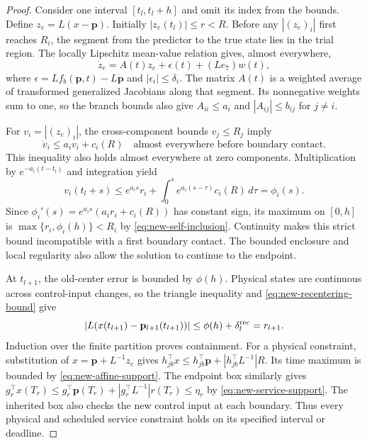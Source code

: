 \documentclass[preprint,12pt]{elsarticle}
\theoremstyle{definition}
\theoremstyle{plain}
\theoremstyle{definition}
\theoremstyle{plain}
\begin{document}
\begin{proof}
Consider one interval $[t_l,t_l+h]$ and omit its index from the bounds.
Define $z_e=L(x-\mathbf p)$. Initially $|z_e(t_l)|\le r<R$.
Before any $|(z_e)_i|$ first reaches $R_i$, the segment from the predictor
to the true state lies in the trial region. The locally Lipschitz
mean-value relation \cite{clarke1990optimization} gives, almost everywhere,
\begin{equation}
 \dot z_e=A(t)z_e+\epsilon(t)+(Le_7)w(t),
 \label{eq:new-error-dynamics}
\end{equation}
where $\epsilon=Lf_b(\mathbf p,t)-L\dot{\mathbf p}$ and
$|\epsilon_i|\le\delta_i$. The matrix $A(t)$ is a weighted average of
transformed generalized Jacobians along that segment. Its nonnegative
weights sum to one, so the branch bounds also give
$A_{ii}\le a_i$ and $|A_{ij}|\le b_{ij}$ for $j\ne i$.

For $v_i=|(z_e)_i|$, the cross-component bounds $v_j\le R_j$ imply
\begin{equation}
 \dot v_i\le a_iv_i+c_i(R)
 \quad\text{almost everywhere before boundary contact}.
 \label{eq:new-error-comparison-proof}
\end{equation}
This inequality also holds almost everywhere at zero components.
Multiplication by $e^{-a_i(t-t_l)}$ and integration yield
\[
 v_i(t_l+s)\le e^{a_i s}r_i+
       \int_0^s e^{a_i(s-\tau)}c_i(R)\,d\tau=\phi_i(s).
\]
Since $\phi_i'(s)=e^{a_i s}(a_ir_i+c_i(R))$ has constant sign,
its maximum on $[0,h]$ is $\max\{r_i,\phi_i(h)\}<R_i$ by
\eqref{eq:new-self-inclusion}. Continuity makes this strict bound
incompatible with a first boundary contact. The bounded enclosure and
local regularity also allow the solution to continue to the endpoint.

At $t_{l+1}$, the old-center error is bounded by $\phi(h)$. Physical
states are continuous across control-input changes, so the triangle inequality
and \eqref{eq:new-recentering-bound} give
\[
 |L(x(t_{l+1})-\mathbf p_{l+1}(t_{l+1}))|
 \le\phi(h)+\delta_l^{\rm rec}=r_{l+1}.
\]
Induction over the finite partition proves containment. For a physical
constraint, substitution of $x=\mathbf p+L^{-1}z_e$ gives
$h_{jb}^\top x\le h_{jb}^\top\mathbf p+|h_{jb}^\top L^{-1}|R$.
Its time maximum is bounded by \eqref{eq:new-affine-support}.
The endpoint box similarly gives
$g_r^\top x(T_r)\le g_r^\top\mathbf p(T_r)+
|g_r^\top L^{-1}|r(T_r)\le\eta_r$ by
\eqref{eq:new-service-support}. The inherited box also checks the new
control input at each boundary. Thus every physical and scheduled service
constraint holds on its specified interval or deadline.
\end{proof}
\end{document}
